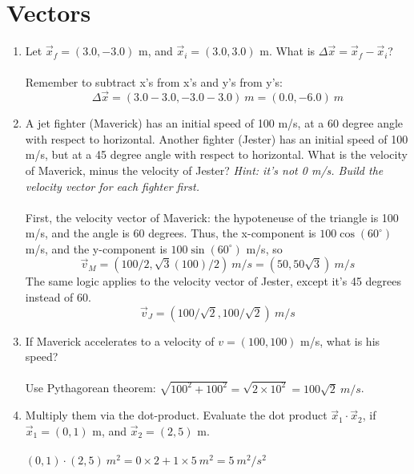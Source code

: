 \documentclass[10pt]{article}
\begin{document}
\section{Vectors}
\begin{enumerate}
\item Let $\vec{x}_f = (3.0,-3.0)$ m, and $\vec{x}_i = (3.0,3.0)$ m.  What is $\Delta \vec{x} = \vec{x}_f - \vec{x}_i$? \\ \\
Remember to subtract x's from x's and y's from y's:
\begin{equation}
\Delta \vec{x} = (3.0-3.0, -3.0 - 3.0) ~ m = (0.0,-6.0) ~ m
\end{equation}
\item A jet fighter (Maverick) has an initial speed of 100 m/s, at a 60 degree angle with respect to horizontal.  Another fighter (Jester) has an initial speed of 100 m/s, but at a 45 degree angle with respect to horizontal.  What is the velocity of Maverick, minus the velocity of Jester?  \textit{Hint: it's not 0 m/s.  Build the velocity vector for each fighter first.} \\ \\
First, the velocity vector of Maverick: the hypoteneuse of the triangle is 100 m/s, and the angle is 60 degrees.  Thus, the x-component is $100 \cos(60^{\circ})$ m/s, and the y-component is $100 \sin(60^{\circ})$ m/s, so 
\begin{equation}
\vec{v}_M = (100/2,\sqrt{3}(100)/2) ~ m/s = (50,50\sqrt{3}) ~ m/s
\end{equation}
The same logic applies to the velocity vector of Jester, except it's 45 degrees instead of 60.
\begin{equation}
\vec{v}_J = (100/\sqrt{2},100/\sqrt{2}) ~ m/s
\end{equation}
\item If Maverick accelerates to a velocity of $v = (100,100)$ m/s, what is his speed? \\ \\
Use Pythagorean theorem: $\sqrt{100^2+100^2} = \sqrt{2 \times 10^2} = 100 \sqrt{2} ~ m/s$.
\item Multiply them via the dot-product.  Evaluate the dot product $\vec{x}_1 \cdot \vec{x}_2$, if $\vec{x}_1 = (0,1)$ m, and $\vec{x}_2 = (2,5)$ m. \\ \\
$(0,1) \cdot (2,5) ~ m^2 = 0\times 2 + 1\times 5 ~ m^2 = 5 ~ m^2 / s^2$
\end{enumerate}
\end{document}
